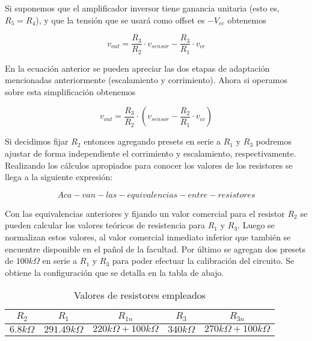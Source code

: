 Si suponemos que el amplificador inversor tiene ganancia unitaria (esto es, $R_5=R_4$), y que la tensión que se usará como offset es $-V_{cc}$ obtenemos

\begin{equation}
    v_{out}= \frac{R_3}{R_2} \cdot v_{sensor}  - \frac{R_3}{R_1} \cdot v_{cc} 
    \label{fig:EJ6_ecuacion_sistema2} 
\end{equation}

En la ecuación anterior se pueden apreciar las dos etapas de adaptación mencionadas anteriormente (escalamiento y corrimiento). Ahora si operamos sobre esta simplificación obtenemos

\begin{equation}
    v_{out}= \frac{R_3}{R_2} \cdot \left( v_{sensor} - \frac{R_2}{R_1} \cdot v_{cc} \right)
    \label{fig:EJ6_ecuacion_sistema_simplificada_final} 
\end{equation}

Si decidimos fijar $R_2$ entonces agregando presets en serie a $R_1$ y $R_3$ podremos ajustar de forma independiente el corrimiento y escalamiento, respectivamente.
Realizando los c\'alculos apropiados para conocer los valores de los resistores se llega a la siguiente expresi\'on:

\begin{equation}
    Aca-van-las-equivalencias-entre-resistores
    \label{fig:EJ6_ecuacion_resistores}
\end{equation}

Con las equivalencias anteriores y fijando un valor comercial para el resistor $R_2$ se pueden calcular los valores teóricos de resistencia para $R_1$ y $R_3$.
  Luego se normalizan estos valores, al valor comercial inmediato inferior que tambi\'en se encuentre disponible en el pa\~nol de la facultad.
  Por \'ultimo se agregan dos presets de $100k\Omega$ en serie a $R_1$ y $R_3$ para poder efectuar la calibraci\'on del circuito. Se obtiene la configuraci\'on que se detalla en la tabla de abajo.

  \begin{table}[H]
	\begin{center}
		\begin{tabular}{c c c c c}
		$R_2$ & $R_1$ & $R_{1n}$ & $R_3$ & $R_{3n}$ \\
		\hline
		$6.8 k\Omega$ & $291.49 k\Omega$ & $220 k\Omega + 100 k\Omega$ & $340 k\Omega$ & $270 k\Omega + 100 k\Omega$
		\end{tabular}
		
		\caption{Valores de resistores empleados}
	\end{center}
\end{table}

